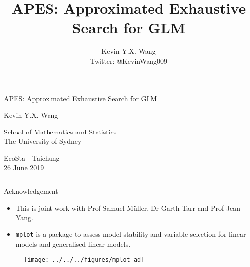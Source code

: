 \documentclass[12pt,aspectratio=169]{beamer}
\title{APES: Approximated Exhaustive Search for GLM}
\author{Kevin Y.X. Wang \\ 
Twitter: @KevinWang009}
\begin{document}


\begin{frame}
\begin{center}
	{\Large \color{myBlue} APES: Approximated Exhaustive Search for GLM}
	
	\vspace{1cm}
	
	{\normalsize  Kevin Y.X. Wang}
	
	\vspace{0.5cm}
	
	{\footnotesize School of Mathematics and Statistics \\ The University of Sydney}

	\vspace{1cm}

	{\normalsize EcoSta - Taichung \\ 26 June 2019}

	\vspace{1cm}
\begin{columns}
	\begin{column}{0.5\linewidth}
	\end{column}
	\begin{column}{0.5\linewidth}
	\end{column}
\end{columns}
\end{center}
\end{frame}


\begin{frame}{Acknowledgement}
\begin{itemize}
	\item This is joint work with Prof Samuel M\"{u}ller, Dr Garth Tarr and Prof Jean Yang.
	
	\item \texttt{mplot} \citep{Tarr2018} is a package to assess model stability and variable selection for linear models and generalised linear models.
\end{itemize}
\begin{figure}
	\centering
	\texttt{[image: ../../../figures/mplot\_ad]}
	\label{fig:mplotad}
\end{figure}
\end{frame}
\end{document}
